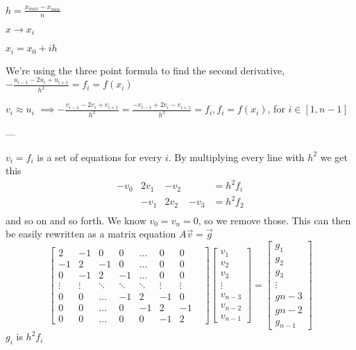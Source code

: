 \documentclass[english,notitlepage]{revtex4-1}  %
\begin{document}
$h = \frac{x_{max} - x_{min}}{n} $

$ x \rightarrow x_i$

$x_i = x_0 + ih$

We're using the three point formula to find the second derivative, $-\frac{u_{i-1} -2 u_i + u_{i+1}}{h^2} = f_i = f(x_i)$ 

$v_i \approx u_i$ $\implies -\frac{v_{i-1} -2 v_i + v_{i+1}}{h^2} = \frac{-v_{i-1} + 2 v_i - v_{i+1}}{h^2} = f_i, f_i = f(x_i)$, for $i \in [1, n-1]$



---



$v_i = f_i$ is a set of equations for every $i$. By multiplying every line with $h^2$ we get this
$$
\begin{matrix}
	-v_0 & 2v_1 & -v_2  &           & = h^2f_i \\
	& -v_1 &  2v_2 & - v_3 & = h^2f_2 \\
\end{matrix}
$$
and so on and so forth. We know $v_0 = v_n = 0$, so we remove those. This can then be easily rewritten as a matrix equation $A\vec{v} = \vec{g}$
$$
\begin{bmatrix}
	2  & -1 & 0  & 0  & \dots & 0 & 0 & \\
	-1 &  2 & -1 & 0  & \dots & 0 & 0 \\
	0  & -1 & 2  & -1 & \dots & 0 & 0 \\
	\vdots & \vdots & \ddots & \ddots & \ddots & \vdots & \vdots \\
	0 & 0 & \dots &-1 & 2 & -1 & 0 \\
	0 & 0 & \dots & 0 & -1 & 2  & -1 \\
	0 & 0 & \dots & 0 & 0 & -1 & 2
	
\end{bmatrix}
\begin{bmatrix}
	v_1 \\ v_2 \\ v_3 \\ \vdots \\ v_{n-3} \\v_{n-2} \\ v_{n-1}
\end{bmatrix}
=
\begin{bmatrix}
	g_1 \\ g_2 \\ g_3 \\ \vdots \\ g{n-3} \\ g{n-2} \\ g_{n-1}
\end{bmatrix}
$$
$g_i$ is $h^2f_i $
\end{document}
